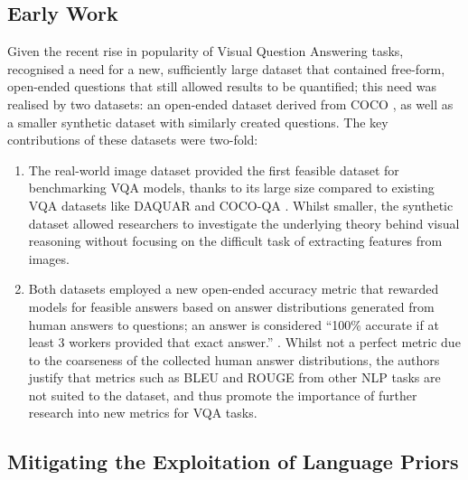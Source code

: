 
\subsection{Early Work} 

Given the recent rise in popularity of Visual Question Answering tasks, \citeauthor{antol2015vqa} recognised a need for a new, sufficiently large dataset that contained free-form, open-ended questions that still allowed results to be quantified; this need was realised by two datasets: an open-ended dataset derived from COCO \cite{lin2014microsoft}, as well as a smaller synthetic dataset with similarly created questions.\cite{antol2015vqa} The key contributions of these datasets were two-fold:

\begin{enumerate}
    \item The real-world image dataset provided the first feasible dataset for benchmarking VQA models, thanks to its large size compared to existing VQA datasets like DAQUAR \cite{malinowski2014multiworld} and COCO-QA \cite{ren2015exploring}. Whilst smaller, the synthetic dataset allowed researchers to investigate the underlying theory behind visual reasoning without focusing on the difficult task of extracting features from images.
    \item Both datasets employed a new open-ended accuracy metric that rewarded models for feasible answers based on answer distributions generated from human answers to questions; an answer is considered ``100\% accurate if at least 3 workers provided that exact answer.'' \citeauthor{antol2015vqa}. Whilst not a perfect metric due to the coarseness of the collected human answer distributions, the authors justify that metrics such as BLEU and ROUGE from other NLP tasks are not suited to the dataset, and thus promote the importance of further research into new metrics for VQA tasks.
\end{enumerate}


\subsection{Mitigating the Exploitation of Language Priors} 

